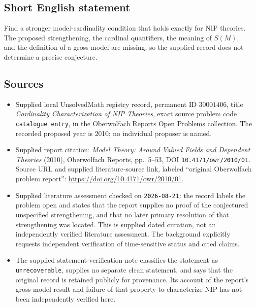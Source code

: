 \documentclass[11pt]{article}
\begin{document}
\subsection{Short English statement}
Find a stronger model-cardinality condition that holds exactly for NIP theories. The proposed strengthening, the cardinal quantifiers, the meaning of \(S(M)\), and the definition of a gross model are missing, so the supplied record does not determine a precise conjecture.
\subsection{Sources}
\begin{itemize}
\item Supplied local UnsolvedMath registry record, permanent ID \(30001406\), title \emph{Cardinality Characterization of NIP Theories}, exact source problem code \texttt{catalogue entry}, in the Oberwolfach Reports Open Problems collection. The recorded proposed year is 2010; no individual proposer is named.
\item Supplied report citation: \emph{Model Theory: Around Valued Fields and Dependent Theories} (2010), Oberwolfach Reports, pp.\ 5--53, DOI \texttt{10.4171/owr/2010/01}. Source URL and supplied literature-source link, labeled ``original Oberwolfach problem report'': \url{https://doi.org/10.4171/owr/2010/01}.
\item Supplied literature assessment checked on \texttt{2026-08-21}: the record labels the problem open and states that the report supplies no proof of the conjectured unspecified strengthening, and that no later primary resolution of that strengthening was located. This is supplied dated curation, not an independently verified literature assessment. The background explicitly requests independent verification of time-sensitive status and cited claims.
\item The supplied statement-verification note classifies the statement as \texttt{unrecoverable}, supplies no separate clean statement, and says that the original record is retained publicly for provenance. Its account of the report's gross-model result and failure of that property to characterize NIP has not been independently verified here.
\end{itemize}
\end{document}
